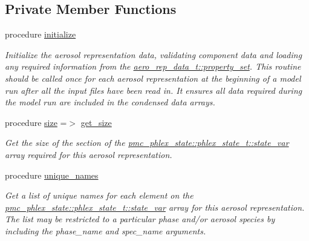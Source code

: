\subsection*{Private Member Functions}
\begin{DoxyCompactItemize}
\item 
procedure \mbox{\hyperlink{structpmc__aero__rep__modal__binned__mass_1_1aero__rep__modal__binned__mass__t_aa541d9a673528ca3425ed237e8a853c2}{initialize}}
\begin{DoxyCompactList}\small\item\em Initialize the aerosol representation data, validating component data and loading any required information from the {\ttfamily \mbox{\hyperlink{structpmc__aero__rep__data_1_1aero__rep__data__t_a87b1bf5cd10a0a2b51390fb24ebf56c5}{aero\+\_\+rep\+\_\+data\+\_\+t\+::property\+\_\+set}}}. This routine should be called once for each aerosol representation at the beginning of a model run after all the input files have been read in. It ensures all data required during the model run are included in the condensed data arrays. \end{DoxyCompactList}\item 
procedure \mbox{\hyperlink{structpmc__aero__rep__modal__binned__mass_1_1aero__rep__modal__binned__mass__t_ae99f9c2cc3f00ba33fdae532457664b2}{size}} =$>$ \mbox{\hyperlink{interfacepmc__aero__rep__data_1_1get__size}{get\+\_\+size}}
\begin{DoxyCompactList}\small\item\em Get the size of the section of the {\ttfamily \mbox{\hyperlink{structpmc__phlex__state_1_1phlex__state__t_a78835cb552d483ebbfc7a6bc6f756918}{pmc\+\_\+phlex\+\_\+state\+::phlex\+\_\+state\+\_\+t\+::state\+\_\+var}}} array required for this aerosol representation. \end{DoxyCompactList}\item 
procedure \mbox{\hyperlink{structpmc__aero__rep__modal__binned__mass_1_1aero__rep__modal__binned__mass__t_ad92dc1ac6ed79708d3819a305dd25e5c}{unique\+\_\+names}}
\begin{DoxyCompactList}\small\item\em Get a list of unique names for each element on the {\ttfamily \mbox{\hyperlink{structpmc__phlex__state_1_1phlex__state__t_a78835cb552d483ebbfc7a6bc6f756918}{pmc\+\_\+phlex\+\_\+state\+::phlex\+\_\+state\+\_\+t\+::state\+\_\+var}}} array for this aerosol representation. The list may be restricted to a particular phase and/or aerosol species by including the phase\+\_\+name and spec\+\_\+name arguments. \end{DoxyCompactList}\item 

\end{DoxyCompactItemize}

